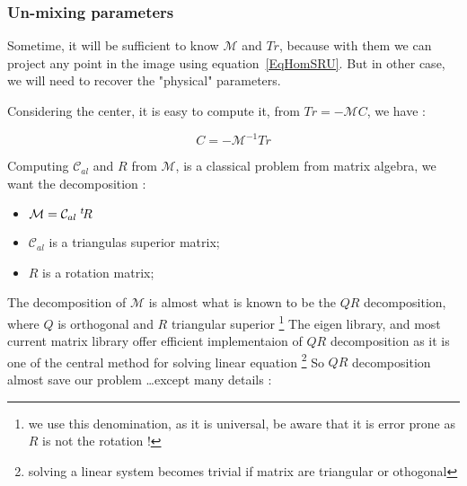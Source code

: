 \subsubsection{Un-mixing parameters}

Sometime, it will be sufficient to know $\mathcal{M}$ and $Tr$, because
with them we can project any point in the image using equation~\ref{EqHomSRU}.
But in other case, we will need to recover the "physical" parameters.

Considering the center, it is easy to compute it, from $Tr = -\mathcal{M} C$, we have :

\begin{equation}
	C= - \mathcal{M}^{-1} Tr \label{PoseUnCalEstimC}
\end{equation}

Computing $\mathcal{C}_{al}$ and $R$ from $\mathcal{M}$, is a classical problem
from matrix algebra, we want the decomposition :

\begin{itemize}
    \item   $\mathcal{M} = \mathcal{C}_{al} \; ^{t} \! R $
    \item   $\mathcal{C}_{al} $  is a triangulas superior matrix;
    \item   $R $  is a rotation matrix;
\end{itemize}

The decomposition of $\mathcal{M}$ is almost what is known to
be the $QR$ decomposition, where $Q$ is orthogonal and $R$ triangular superior
\footnote{we use this  denomination, as it is universal, be aware that it is
error prone as $R$ is not the rotation !}
The eigen library, and most current matrix library offer efficient implementaion
of $QR$ decomposition as it is one of the central method for solving linear
equation \footnote{solving a linear system becomes trivial if matrix are
triangular or othogonal}
So $QR$ decomposition almost save our problem \dots except many details :

